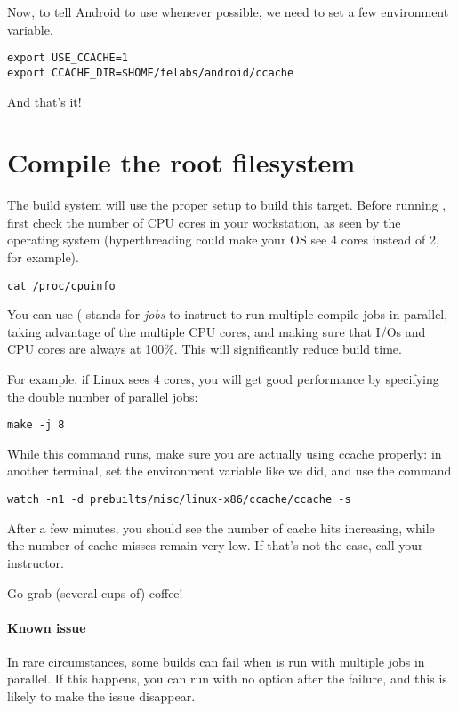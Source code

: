 Now, to tell Android to use  whenever possible, we need
to set a few environment variable.

\begin{verbatim}
export USE_CCACHE=1
export CCACHE_DIR=$HOME/felabs/android/ccache
\end{verbatim}

And that's it!

\section{Compile the root filesystem}

The build system will use the proper setup to build this
target. Before running , first check the number of CPU
cores in your workstation, as seen by the operating system
(hyperthreading could make your OS see 4 cores instead of 2, for
example).

\begin{verbatim}
cat /proc/cpuinfo
\end{verbatim}

You can use  ( stands for {\it jobs} to instruct
 to run multiple compile jobs in parallel, taking advantage
of the multiple CPU cores, and making sure that I/Os and CPU cores are
always at 100\%. This will significantly reduce build time.

For example, if Linux sees 4 cores, you will get good performance by
specifying the double number of parallel jobs:

\begin{verbatim}
make -j 8
\end{verbatim}

While this command runs, make sure you are actually using ccache
properly: in another terminal, set the  environment
variable like we did, and use the command

\begin{verbatim}
watch -n1 -d prebuilts/misc/linux-x86/ccache/ccache -s
\end{verbatim}

After a few minutes, you should see the number of cache hits
increasing, while the number of cache misses remain very low. If
that's not the case, call your instructor.

Go grab (several cups of) coffee!

\paragraph{Known issue}
In rare circumstances, some builds can fail when  is run
with multiple jobs in parallel. If this happens, you can run
 with no option after the failure, and this is likely to
make the issue disappear.

